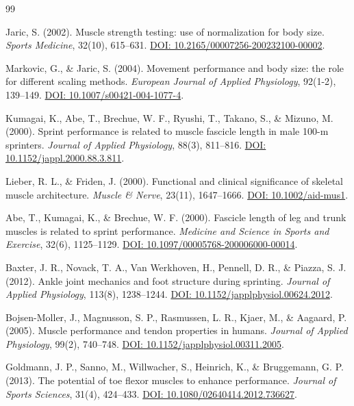 \documentclass[11pt,a4paper]{article}
\begin{document}
\begin{thebibliography}{99}

Jaric, S. (2002). Muscle strength testing: use of normalization for body size. \textit{Sports Medicine}, 32(10), 615--631. \href{https://doi.org/10.2165/00007256-200232100-00002}{DOI: 10.2165/00007256-200232100-00002}.

Markovic, G., \& Jaric, S. (2004). Movement performance and body size: the role for different scaling methods. \textit{European Journal of Applied Physiology}, 92(1-2), 139--149. \href{https://doi.org/10.1007/s00421-004-1077-4}{DOI: 10.1007/s00421-004-1077-4}.

Kumagai, K., Abe, T., Brechue, W. F., Ryushi, T., Takano, S., \& Mizuno, M. (2000). Sprint performance is related to muscle fascicle length in male 100-m sprinters. \textit{Journal of Applied Physiology}, 88(3), 811--816. \href{https://doi.org/10.1152/jappl.2000.88.3.811}{DOI: 10.1152/jappl.2000.88.3.811}.

Lieber, R. L., \& Friden, J. (2000). Functional and clinical significance of skeletal muscle architecture. \textit{Muscle \& Nerve}, 23(11), 1647--1666. \href{https://doi.org/10.1002/1097-4598(200011)23:11<1647::aid-mus1>3.0.co;2-m}{DOI: 10.1002/aid-mus1}.

Abe, T., Kumagai, K., \& Brechue, W. F. (2000). Fascicle length of leg and trunk muscles is related to sprint performance. \textit{Medicine and Science in Sports and Exercise}, 32(6), 1125--1129. \href{https://doi.org/10.1097/00005768-200006000-00014}{DOI: 10.1097/00005768-200006000-00014}.

Baxter, J. R., Novack, T. A., Van Werkhoven, H., Pennell, D. R., \& Piazza, S. J. (2012). Ankle joint mechanics and foot structure during sprinting. \textit{Journal of Applied Physiology}, 113(8), 1238--1244. \href{https://doi.org/10.1152/japplphysiol.00624.2012}{DOI: 10.1152/japplphysiol.00624.2012}.

Bojsen-Moller, J., Magnusson, S. P., Rasmussen, L. R., Kjaer, M., \& Aagaard, P. (2005). Muscle performance and tendon properties in humans. \textit{Journal of Applied Physiology}, 99(2), 740--748. \href{https://doi.org/10.1152/japplphysiol.00311.2005}{DOI: 10.1152/japplphysiol.00311.2005}.

Goldmann, J. P., Sanno, M., Willwacher, S., Heinrich, K., \& Bruggemann, G. P. (2013). The potential of toe flexor muscles to enhance performance. \textit{Journal of Sports Sciences}, 31(4), 424--433. \href{https://doi.org/10.1080/02640414.2012.736627}{DOI: 10.1080/02640414.2012.736627}.


\end{thebibliography}
\end{document}
